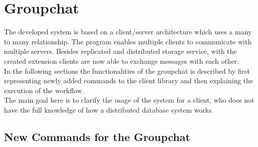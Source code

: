 \section{Groupchat}
\label{sec:groupchat}

The developed system is based on a client/server architecture which uses a many to many relationship. The program enables multiple clients to communicate with multiple servers. Besides replicated and distributed storage service, with the created extension clients are now able to exchange messages with each other.\\ In the following sections the functionalities of the groupchat is described by first representing newly added commands to the client library and then explaining the execution of the workflow. \\
The main goal here is to clarify the usage of the system for a client, who does not have the full knowledge of how a distributed database system works.

\subsection{New Commands for the Groupchat}
\label{sec:groupchat_commands}


